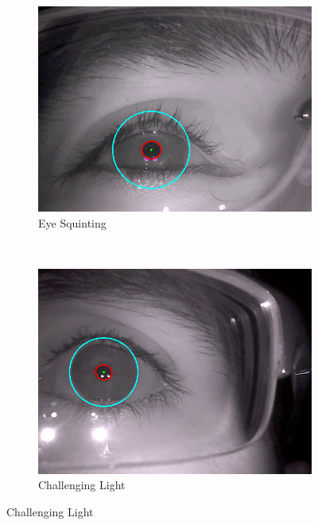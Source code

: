 \begin{figure}[t]
	\centering
	
	\begin{subfigure}[b]{0.5\textwidth}
		\centering
		\includegraphics[width=\textwidth]{final/images/good1.png}
		\caption{Eye Squinting}
		\label{subfig:squinting}
	\end{subfigure}%
	~
	\begin{subfigure}[b]{0.5\textwidth}
		\centering
		\includegraphics[width=\textwidth]{final/images/good2.png}
		\caption{Challenging Light}
		\label{subfig:challenging_light}
	\end{subfigure}
	

\end{figure}
